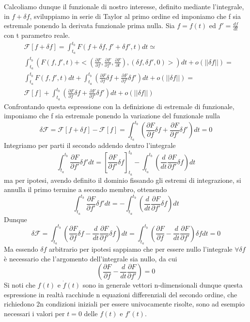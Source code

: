 \documentclass[
10pt, %
a4paper, %
oneside, %
headinclude,footinclude, %
BCOR5mm, %
]{scrartcl}
\begin{document}
\begin{dimostrazione}
Calcoliamo dunque il funzionale di nostro interesse, definito mediante l'integrale, in \(f+\delta f\), sviluppiamo in serie di Taylor al primo ordine ed imponiamo che f sia estremale ponendo la derivata funzionale prima nulla. Sia \(f = f(t)\) ed \(f' = \frac{df}{dt}\) con t parametro reale.
\begin{align*}
	&\mathcal{F}[f+\delta f] = \int_{t_a}^{t_b}F(f+\delta f, f'+ \delta f', t)dt\simeq\\
	&\int_{t_a}^{t_b}\left(F(f, f', t)+<\left(\frac{\partial F}{\partial f}, \frac{\partial F}{\partial f'}, \frac{\partial F}{\partial t}\right), (\delta f, \delta f', 0)>\right)dt+o(||\delta f||)=\\
	&\int_{t_a}^{t_b}F(f, f', t)dt+\int_{t_a}^{t_b} \left(\frac{\partial F}{\partial f}\delta f+\frac{\partial F}{\partial f'}\delta f' \right)dt+o(||\delta f||)=\\
	&\mathcal{F}[f]+\int_{t_a}^{t_b} \left(\frac{\partial F}{\partial f}\delta f+\frac{\partial F}{\partial f'}\delta f' \right)dt+o(||\delta f||)
\end{align*}
Confrontando questa espressione con la definizione di estremale di funzionale, imponiamo che f sia estremale ponendo la variazione del funzionale nulla
\[\delta \mathcal{F} = \mathcal{F}[f+\delta f]-\mathcal{F}[f] = \int_{t_a}^{t_b} \left(\frac{\partial F}{\partial f}\delta f+\frac{\partial F}{\partial f'}\delta f' \right)dt= 0\]
Integriamo per parti il secondo addendo dentro l'integrale
\[\int_{t_a}^{t_b} \frac{\partial F}{\partial f'}\delta f'dt = \left[\frac{\partial F}{\partial f'}\delta f\right]^{t_b}_{t_a}-\int_{t_a}^{t_b}\left(\frac{d}{dt}\frac{\partial F}{\partial f'}\delta f\right)dt\]
ma per ipotesi, avendo definito il dominio fissando gli estremi di integrazione, si annulla il primo termine a secondo membro, ottenendo
\[\int_{t_a}^{t_b} \frac{\partial F}{\partial f'}\delta f'dt = -\int_{t_a}^{t_b}\left(\frac{d}{dt}\frac{\partial F}{\partial f'}\delta f\right)dt\]
Dunque
\[\delta \mathcal{F} = \int_{t_a}^{t_b} \left(\frac{\partial F}{\partial f}\delta f- \frac{d}{dt}\frac{\partial F}{\partial f'}\delta f\right)dt= \int_{t_a}^{t_b} \left(\frac{\partial F}{\partial f}- \frac{d}{dt}\frac{\partial F}{\partial f'}\right)\delta fdt = 0\]
Ma essendo $\delta f$ arbitrario per ipotesi sappiamo che per essere nullo l'integrale \(\forall \delta f\) è necessario che l'argomento dell'integrale sia nullo, da cui
\[\left(\frac{\partial F}{\partial f}- \frac{d}{dt}\frac{\partial F}{\partial f'}\right) = 0\]
Si noti che \(f(t)\) e $\dot{f}(t)$ sono in generale vettori n-dimensionali dunque questa espressione in realtà racchiude n equazioni differenziali del secondo ordine, che richiedono 2n condizioni iniziali per essere univocamente risolte, sono ad esempio necessari i valori per \(t=0\) delle \(f(t)\) e \(f'(t)\).
\end{dimostrazione}
\end{document}

